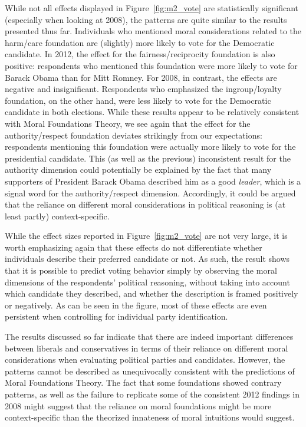 \documentclass[12pt]{article}
\begin{document}
While not all effects displayed in Figure~\ref{fig:m2_vote} are statistically significant (especially when looking at 2008), the patterns are quite similar to the results presented thus far. Individuals who mentioned moral considerations related to the harm/care foundation are (slightly) more likely to vote for the Democratic candidate. In 2012, the effect for the fairness/reciprocity foundation is also positive: respondents who mentioned this foundation were more likely to vote for Barack Obama than for Mitt Romney. For 2008, in contrast, the effects are negative and insignificant. Respondents who emphasized the ingroup/loyalty foundation, on the other hand, were less likely to vote for the Democratic candidate in both elections. While these results appear to be relatively consistent with Moral Foundations Theory, we see again that the effect for the authority/respect foundation deviates strikingly from our expectations: respondents mentioning this foundation were actually more likely to vote for the presidential candidate. This (as well as the previous) inconsistent result for the authority dimension could potentially be explained by the fact that many supporters of President Barack Obama described him as a good \textit{leader}, which is a signal word for the authority/respect dimension. Accordingly, it could be argued that the reliance on different moral considerations in political reasoning is (at least partly) context-specific.

While the effect sizes reported in Figure~\ref{fig:m2_vote} are not very large, it is worth emphasizing again that these effects do not differentiate whether individuals describe their preferred candidate or not. As such, the result shows that it is possible to predict voting behavior simply by observing the moral dimensions of the respondents' political reasoning, without taking into account which candidate they described, and whether the description is framed positively or negatively. As can be seen in the figure, most of these effects are even persistent when controlling for individual party identification.

The results discussed so far indicate that there are indeed important differences between liberals and conservatives in terms of their reliance on different moral considerations when evaluating political parties and candidates. However, the patterns cannot be described as unequivocally consistent with the predictions of Moral Foundations Theory. The fact that some foundations showed contrary patterns, as well as the failure to replicate some of the consistent 2012 findings in 2008 might suggest that the reliance on moral foundations might be more context-specific than the theorized innateness of moral intuitions would suggest.
\end{document}
